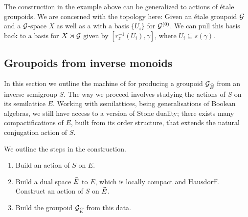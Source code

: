 \begin{example}
The construction in the example above can be generalized to actions of \'etale groupoids. We are concerned with the topology here: Given an \'etale groupoid $\mathcal{G}$ and a $\mathcal{G}$-space $X$ as well as a with a basis $\lbrace U_{i} \rbrace$ for $\mathcal{G}^{(0)}$. We can pull this basis back to a basis for $X \rtimes \mathcal{G}$ given by $[r_{z}^{-1}(U_{i}),\gamma]$, where $U_{i} \subseteq s(\gamma)$.
\end{example}

\subsection{Groupoids from inverse monoids}\label{sect:semitogrpoid}
In this section we outline the machine of \cite{MR1724106,MR2419901} for producing a groupoid $\mathcal{G}_{\widehat{E}}$ from an inverse semigroup $S$. The way we proceed involves studying the actions of $S$ on its semilattice $E$. Working with semilattices, being generalisations of Boolean algebras, we still have access to a version of Stone duality; there exists many compactifications of $E$, built from its order structure, that extends the natural conjugation action of $S$. 

We outline the steps in the construction.
\begin{enumerate}
\item Build an action of $S$ on $E$.
\item Build a dual space $\widehat{E}$ to $E$, which is locally compact and Hausdorff. Construct an action of $S$ on $\widehat{E}$.
\item Build the groupoid $\mathcal{G}_{\widehat{E}}$ from this data.
\end{enumerate}

